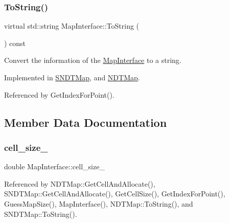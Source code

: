 \mbox{\label{classMapInterface_a87b132e1a619eb21e0ac684fc25f8c74}} 
\subsubsection{\texorpdfstring{To\+String()}{ToString()}}
{\footnotesize\ttfamily virtual std\+::string Map\+Interface\+::\+To\+String (\begin{DoxyParamCaption}{ }\end{DoxyParamCaption}) const\hspace{0.3cm}{\ttfamily [pure virtual]}}



Convert the information of the \hyperlink{classMapInterface}{Map\+Interface} to a string. 



Implemented in \hyperlink{classSNDTMap_a38be62c377da486f006e194e24e77212}{S\+N\+D\+T\+Map}, and \hyperlink{classNDTMap_a355a32d48208aa5bcc361b4be1d6320c}{N\+D\+T\+Map}.



Referenced by Get\+Index\+For\+Point().



\subsection{Member Data Documentation}
\mbox{\label{classMapInterface_a67c2db325b44e03954d845b5d626daf6}} 
\subsubsection{\texorpdfstring{cell\+\_\+size\+\_\+}{cell\_size\_}}
{\footnotesize\ttfamily double Map\+Interface\+::cell\+\_\+size\+\_\+\hspace{0.3cm}{\ttfamily [protected]}}



Referenced by N\+D\+T\+Map\+::\+Get\+Cell\+And\+Allocate(), S\+N\+D\+T\+Map\+::\+Get\+Cell\+And\+Allocate(), Get\+Cell\+Size(), Get\+Index\+For\+Point(), Guess\+Map\+Size(), Map\+Interface(), N\+D\+T\+Map\+::\+To\+String(), and S\+N\+D\+T\+Map\+::\+To\+String().

